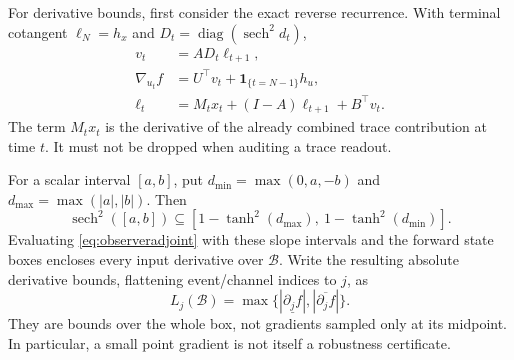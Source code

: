 \documentclass[11pt,a4paper]{article}
\theoremstyle{definition}\newtheorem{definition}[theorem]{Definition}
\begin{document}
For derivative bounds, first consider the exact reverse recurrence. With terminal cotangent $\ell_N=h_x$ and $D_t=\operatorname{diag}(\operatorname{sech}^2d_t)$,
\begin{align}
 v_t&=AD_t\ell_{t+1},\\
 \nabla_{u_t}f&=U^\top v_t+\mathbf1_{\{t=N-1\}}h_u,\\
 \ell_t&=M_tx_t+(I-A)\ell_{t+1}+B^\top v_t.
 \label{eq:observeradjoint}
\end{align}
The term $M_tx_t$ is the derivative of the already combined trace contribution at time $t$. It must not be dropped when auditing a trace readout.

For a scalar interval $[a,b]$, put $d_{\min}=\max(0,a,-b)$ and $d_{\max}=\max(|a|,|b|)$. Then
\[
 \operatorname{sech}^2([a,b])\subseteq
 [1-\tanh^2(d_{\max}),\ 1-\tanh^2(d_{\min})].
\]
Evaluating \eqref{eq:observeradjoint} with these slope intervals and the forward state boxes encloses every input derivative over $\mathcal B$. Write the resulting absolute derivative bounds, flattening event/channel indices to $j$, as
\begin{equation}
 L_j(\mathcal B)=\max\{|\underline{\partial_jf}|,|\overline{\partial_jf}|\}.
 \label{eq:observergain}
\end{equation}
They are bounds over the whole box, not gradients sampled only at its midpoint. In particular, a small point gradient is not itself a robustness certificate.
\end{document}
